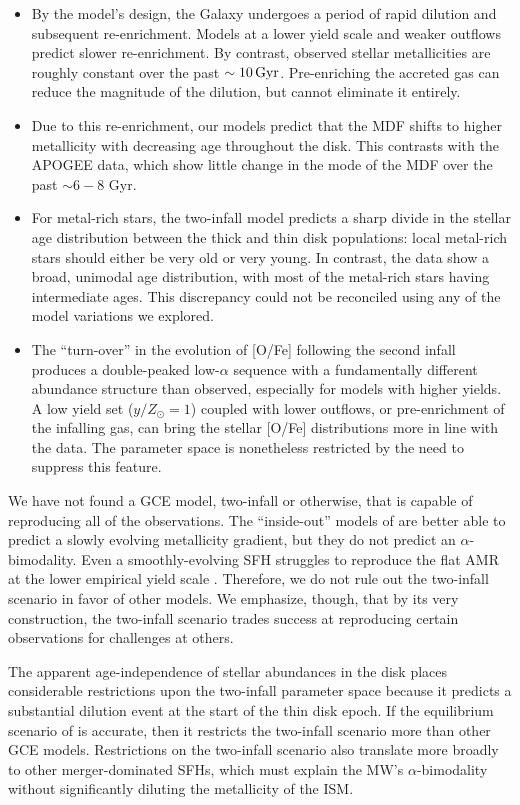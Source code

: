 \documentclass[twocolumn,twocolappendix]{aastex701}
\newcommand{\yZ}[1]{$y/Z_\odot=#1$}
\newcommand{\Gyr}{\,{\rm Gyr}}
\begin{document}
\begin{itemize}
    \item By the model's design, the Galaxy undergoes a period of rapid dilution and subsequent re-enrichment. Models at a lower yield scale and weaker outflows predict slower re-enrichment. By contrast, observed stellar metallicities are roughly constant over the past $\sim10\Gyr$. Pre-enriching the accreted gas can reduce the magnitude of the dilution, but cannot eliminate it entirely.
    \item Due to this re-enrichment, our models predict that the MDF shifts to higher metallicity with decreasing age throughout the disk. This contrasts with the APOGEE data, which show little change in the mode of the MDF over the past $\sim6-8$ Gyr.
    \item For metal-rich stars, the two-infall model predicts a sharp divide in the stellar age distribution between the thick and thin disk populations: local metal-rich stars should either be very old or very young. In contrast, the data show a broad, unimodal age distribution, with most of the metal-rich stars having intermediate ages. This discrepancy could not be reconciled using any of the model variations we explored.
    \item The ``turn-over'' in the evolution of [O/Fe] following the second infall produces a double-peaked low-$\alpha$ sequence with a fundamentally different abundance structure than observed, especially for models with higher yields. A low yield set (\yZ{1}) coupled with lower outflows, or pre-enrichment of the infalling gas, can bring the stellar [O/Fe] distributions more in line with the data. The parameter space is nonetheless restricted by the need to suppress this feature.
\end{itemize}

We have not found a GCE model, two-infall or otherwise, that is capable of reproducing all of the observations. The ``inside-out'' models of \citet{johnson_stellar_2021} are better able to predict a slowly evolving metallicity gradient, but they do not predict an $\alpha$-bimodality. Even a smoothly-evolving SFH struggles to reproduce the flat AMR at the lower empirical yield scale \citep{johnson_milky_2025}. Therefore, we do not rule out the two-infall scenario in favor of other models. We emphasize, though, that by its very construction, the two-infall scenario trades success at reproducing certain observations for challenges at others.

The apparent age-independence of stellar abundances in the disk places considerable restrictions upon the two-infall parameter space because it predicts a substantial dilution event at the start of the thin disk epoch. If the equilibrium scenario of \citet{johnson_milky_2025} is accurate, then it restricts the two-infall scenario more than other GCE models. Restrictions on the two-infall scenario also translate more broadly to other merger-dominated SFHs, which must explain the MW's $\alpha$-bimodality without significantly diluting the metallicity of the ISM.
\end{document}
